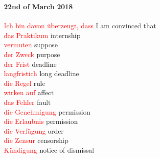 \documentclass{article}
\begin{document}
\begin{multicols}{2}
	\textbf{22nd of March 2018}\\\\
	\textcolor{red}{Ich bin davon überzeugt, dass} I am convinced that\\
	\textcolor{red}{das Praktikum} internship\\
	\textcolor{red}{vermuten} suppose\\
	\textcolor{red}{der Zweck} purpose\\
	\textcolor{red}{der Frist} deadline\\
	\textcolor{red}{langfristich} long deadline\\
	\textcolor{red}{die Regel} rule\\
	\textcolor{red}{wirken auf} affect\\
	\textcolor{red}{das Fehler} fault\\
	\textcolor{red}{die Genehmigung} permission\\
	\textcolor{red}{die Erlaubnis} permission\\
	\textcolor{red}{die Verfügung} order\\
	\textcolor{red}{die Zensur} censorship\\
	\textcolor{red}{Kündigung} notice of dismissal\\\\
	

\end{multicols}
\end{document}
